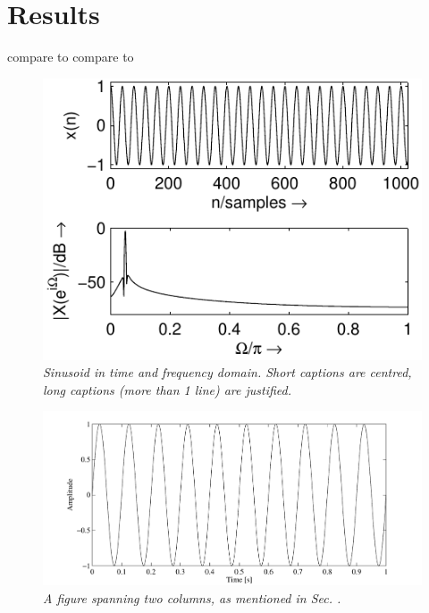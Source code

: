 \documentclass[twoside,a4paper]{article}
\begin{document}
\section{Results}

compare to \cite{brinkmann_round_2019}
compare to \cite{campbell_roomsim_nodate}


\begin{figure}[ht]
\centerline{\includegraphics[scale=0.8]{fft_plot2}}
\caption{\label{fft_plot}{\it Sinusoid in time and frequency domain. Short captions are centred, long captions (more than 1 line) are justified.}}
\end{figure}
%
\begin{figure}[ht]
\center
\includegraphics[width=5in]{TwoColumnSine2}
\caption{\label{ftt_plot2}{\it A figure spanning two columns, as mentioned in Sec. . }}
\end{figure}


\end{document}
